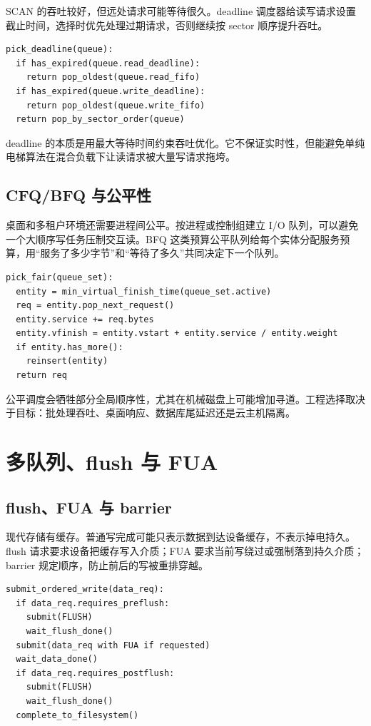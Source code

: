SCAN 的吞吐较好，但远处请求可能等待很久。deadline 调度器给读写请求设置截止时间，选择时优先处理过期请求，否则继续按 sector 顺序提升吞吐。

\begin{lstlisting}
pick_deadline(queue):
  if has_expired(queue.read_deadline):
    return pop_oldest(queue.read_fifo)
  if has_expired(queue.write_deadline):
    return pop_oldest(queue.write_fifo)
  return pop_by_sector_order(queue)
\end{lstlisting}

deadline 的本质是用最大等待时间约束吞吐优化。它不保证实时性，但能避免单纯电梯算法在混合负载下让读请求被大量写请求拖垮。

\subsection{CFQ/BFQ 与公平性}

桌面和多租户环境还需要进程间公平。按进程或控制组建立 I/O 队列，可以避免一个大顺序写任务压制交互读。BFQ 这类预算公平队列给每个实体分配服务预算，用“服务了多少字节”和“等待了多久”共同决定下一个队列。

\begin{lstlisting}
pick_fair(queue_set):
  entity = min_virtual_finish_time(queue_set.active)
  req = entity.pop_next_request()
  entity.service += req.bytes
  entity.vfinish = entity.vstart + entity.service / entity.weight
  if entity.has_more():
    reinsert(entity)
  return req
\end{lstlisting}

公平调度会牺牲部分全局顺序性，尤其在机械磁盘上可能增加寻道。工程选择取决于目标：批处理吞吐、桌面响应、数据库尾延迟还是云主机隔离。

\section{多队列、flush 与 FUA}

\subsection{flush、FUA 与 barrier}

现代存储有缓存。普通写完成可能只表示数据到达设备缓存，不表示掉电持久。flush 请求要求设备把缓存写入介质；FUA 要求当前写绕过或强制落到持久介质；barrier 规定顺序，防止前后的写被重排穿越。

\begin{lstlisting}
submit_ordered_write(data_req):
  if data_req.requires_preflush:
    submit(FLUSH)
    wait_flush_done()
  submit(data_req with FUA if requested)
  wait_data_done()
  if data_req.requires_postflush:
    submit(FLUSH)
    wait_flush_done()
  complete_to_filesystem()
\end{lstlisting}

